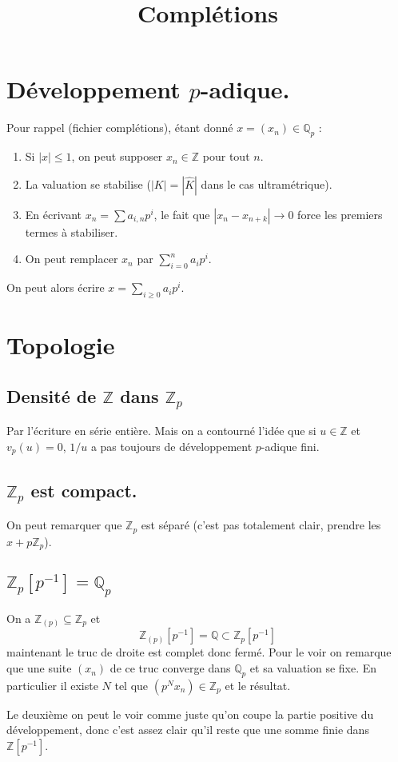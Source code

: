 \documentclass[a4paper,12pt]{book}
\title{Complétions}
\date{}
\newcommand{\Z}{\mathbb{Z}}
\newcommand{\Q}{\mathbb{Q}}
\theoremstyle{plain}
\theoremstyle{definition}
\theoremstyle{remark}
\begin{document}
\maketitle


\section{Développement $p$-adique.}
Pour rappel (fichier complétions), étant donné $x=(x_n)\in \Q_p$ : 
\begin{enumerate}
    \item Si $|x|\leq 1$, on peut supposer $x_n\in \Z$ pour tout
        $n$.
    \item La valuation se stabilise ($|K|=|\hat K|$ dans le cas
        ultramétrique).
    \item En écrivant $x_n=\sum a_{i,n}p^i$, le fait que
        $|x_n-x_{n+k}|\to 0$ force les premiers termes à 
        stabiliser.
    \item On peut remplacer $x_n$ par $\sum_{i=0}^n a_i p^i$.
\end{enumerate}
On peut alors écrire $x=\sum_{i\geq0} a_ip^i$.
\section{Topologie}
\subsection{Densité de $\Z$ dans $\Z_p$}
Par l'écriture en série entière. Mais on a contourné l'idée
que si $u\in \Z$ et $v_p(u)=0$, $1/u$ a pas toujours de
développement $p$-adique fini. 

\subsection{$\Z_p$ est compact.}
On peut remarquer que $\Z_p$ est séparé 
(c'est pas totalement clair, prendre les $x+p\Z_p$). 

\subsection{$\Z_p[p^{-1}]=\Q_p$}
On a $\Z_{(p)}\subseteq \Z_p$ et 
\[\Z_{(p)}[p^{-1}]=\Q\subset \Z_p[p^{-1}]\]
maintenant le truc de droite est complet donc fermé. Pour le voir
on remarque que une suite $(x_n)$ de ce truc converge dans $\Q_p$
et sa valuation se fixe. En particulier il existe $N$ tel que 
$(p^Nx_n)\in \Z_p$ et le résultat.

Le deuxième on peut le voir comme juste qu'on coupe la partie 
positive du développement, donc c'est assez clair qu'il reste que
une somme finie dans $\Z[p^{-1}]$.
\end{document}
